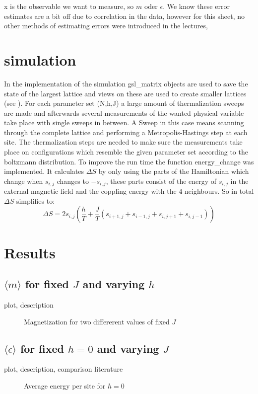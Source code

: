 \documentclass{scrartcl}
\begin{document}
x is the observable we want to measure, so $m$ oder $\epsilon$. We know these error estimates are a bit off due to correlation in the data, however for this sheet, no other methods of estimating errors were introduced in the lectures,

\section{simulation}
In the implementation of the simulation gsl\_matrix objects are used to save the state of the largest lattice and views on these are used to create smaller lattices (see \cite{gsldoc_mat}). For each parameter set (N,h,J) a large amount of thermalization sweeps are made and afterwards several measurements of the wanted physical variable take place with single sweeps in between. A Sweep in this case means scanning through the complete lattice and performing a Metropolis-Hastings step at each site. The thermalization steps are needed to make sure the measurements take place on configurations which resemble the given parameter set according to the boltzmann distribution. To improve the run time the function energy\_change was implemented. It calculates $\Delta S$ by only using the parts of the Hamiltonian which change when $s_{i,j}$ changes to $-s_{i,j}$, these parts consist of the energy of $s_{i,j}$ in the external magnetic field and the coppling energy with the 4 neighbours.
So in total $\Delta S$ simplifies to:
\begin{equation}
	\Delta S=2 s_{i,j}\left(\dfrac{h}{T}+\dfrac{J}{T}(s_{i+1,j}+s_{i-1,j}+s_{i,j+1}+s_{i,j-1})\right)
\end{equation}


\section{Results}


\subsection{$\langle m\rangle$ for fixed $J$ and varying $h$}
plot, description

	\begin{figure}[htbp]
		
		\caption{Magnetization for two differerent values of fixed $J$}
		\label{fig:magfixJ}
	\end{figure}

\subsection{$\langle \epsilon\rangle$ for fixed $h=0$ and varying $J$}
plot, description, comparison literature
	\begin{figure}[htbp]
		
		\caption{Average energy per site for $h=0$}
		\label{fig:energy}
	\end{figure}
\end{document}
